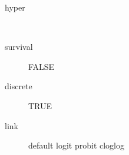 \begin{description}
	\item[hyper]\ 
	 \item[ survival ] FALSE 
	 \item[ discrete ] TRUE 
	 \item[ link ] default logit probit cloglog 
\end{description}

